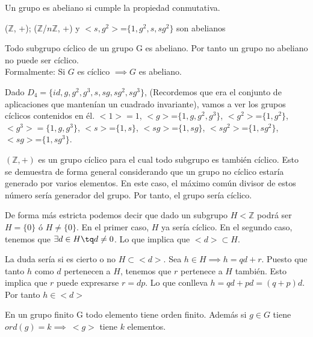\documentclass[a4paper,10pt]{apuntes}
\begin{document}
  \begin{defn}
   Un grupo es abeliano si cumple la propiedad conmutativa.
  \end{defn}

  \begin{example}
   ($\mathbb{Z}$, +); ($\mathbb{Z}$/$n\mathbb{Z}$, +) y $<s,g^{2}>$=$\{1,g^{2},s,sg^{2}\}$ son abelianos
  \end{example}
  
  \begin{lemma}
   Todo subgrupo cíclico de un grupo G es abeliano. Por tanto un grupo no abeliano no puede ser cíclico.\\
   Formalmente: Si $G$ es cíclico $\implies G$ es abeliano.
  \end{lemma}
  
  \begin{example}
   Dado $D_{4}=\{id, g, g^{2}, g^{3}, s, sg, sg^{2},sg^{3}\}$, (Recordemos que era el conjunto de aplicaciones que mantenían un
   cuadrado invariante), vamos a ver los grupos cíclicos contenidos en él.
   $<1>={1}$, $<g>$=$\{1,g,g^{2}, g^{3}\}$, $<g^{2}>$=$\{1,g^{2}\}$, $<g^{3}>=\{1,g, g^{3}\}$, $<s>$=$\{1,s\}$, $<sg>$=$\{1, sg\}$, $<sg^{2}>$=$\{1, sg^{2}\}$, $<sg>$=$\{1, sg^{3}\}$.
   \end{example}
   
   \begin{example}
   $(\mathbb{Z}, +)$ es un grupo cíclico para el cual todo subgrupo es también cíclico. Esto se demuestra
   de forma general considerando que un grupo no cíclico estaría generado por varios elementos. En este caso, el máximo común
   divisor de estos número sería generador del grupo. Por tanto, el grupo sería cíclico.
 
   De forma más estricta podemos decir que dado un subgrupo $H<\mathds{Z}$ podrá ser $H=\{0\}$ ó $H\neq\{0\}$. 
   En el primer caso, $H$ ya sería cíclico. En el segundo caso, tenemos que $\exists d \in H \tq d\neq 0$. Lo que implica que $<d>\subset H$. 
   
   La duda sería si es cierto o no $H\subset <d>$. Sea $h \in H \implies h=qd+r$. Puesto que tanto $h$ como $d$ pertenecen a $H$, tenemos que $r$ pertenece a $H$ también. Esto implica que $r$ puede expresarse $r=dp$. Lo que conlleva $h=qd+pd=(q+p)d$. Por tanto $h \in <d>$
  \end{example}
  \begin{theorem}
   En un grupo finito G todo elemento tiene orden finito. Además si $g\in G$ tiene $ord(g)=k \implies\ <g>$  tiene $k$ elementos.
  \end{theorem}
\end{document}
